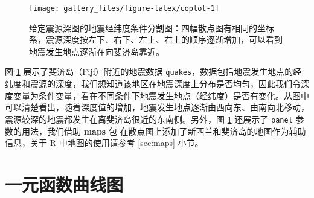 \documentclass[
  b5paper,
  UTF8,twoside]{book}
\newenvironment{Shaded}{\begin{snugshade}}{\end{snugshade}}
\newcommand{\AttributeTok}[1]{\textcolor[rgb]{0.77,0.63,0.00}{#1}}
\newcommand{\ControlFlowTok}[1]{\textcolor[rgb]{0.13,0.29,0.53}{\textbf{#1}}}
\newcommand{\DecValTok}[1]{\textcolor[rgb]{0.00,0.00,0.81}{#1}}
\newcommand{\FloatTok}[1]{\textcolor[rgb]{0.00,0.00,0.81}{#1}}
\newcommand{\FunctionTok}[1]{\textcolor[rgb]{0.00,0.00,0.00}{#1}}
\newcommand{\NormalTok}[1]{#1}
\newcommand{\OtherTok}[1]{\textcolor[rgb]{0.56,0.35,0.01}{#1}}
\newcommand{\SpecialCharTok}[1]{\textcolor[rgb]{0.00,0.00,0.00}{#1}}
\newcommand{\StringTok}[1]{\textcolor[rgb]{0.31,0.60,0.02}{#1}}
\begin{document}
\begin{figure}

{\centering \texttt{[image: gallery\_files/figure-latex/coplot-1]} 

}

\caption[给定震源深图的地震经纬度条件分割图]{给定震源深图的地震经纬度条件分割图：四幅散点图有相同的坐标系，震源深度按左下、右下、左上、右上的顺序逐渐增加，可以看到地震发生地点逐渐在向斐济岛靠近。}\label{fig:coplot}
\end{figure}

图 \ref{fig:coplot}
展示了斐济岛（Fiji）附近的地震数据 \texttt{quakes}，数据包括地震发生地点的经纬度和震源的深度，我们想知道该地区在地震深度上分布是否均匀，因此我们令深度变量为条件变量，看在不同条件下地震发生地点（经纬度）是否有变化。从图中可以清楚看出，随着深度值的增加，地震发生地点逐渐由西向东、由南向北移动，震源较深的地震都发生在离斐济岛很近的东南侧。另外，图 \ref{fig:coplot}
还展示了 \texttt{panel} 参数的用法，我们借助 \textbf{maps} 包 \citep{maps} 在散点图上添加了新西兰和斐济岛的地图作为辅助信息，关于 R 中地图的使用请参考 \ref{sec:maps} 小节。

\hypertarget{sec:curve}{%
\section{一元函数曲线图}\label{sec:curve}}





\begin{Shaded}
\end{Shaded}
\end{document}
